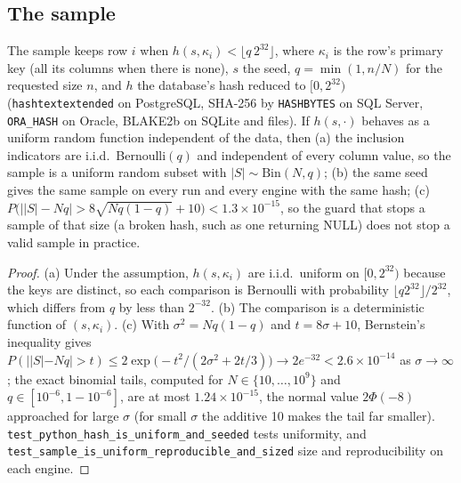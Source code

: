\subsection{The sample}
\begin{proposition}\label{prop:hashsample}
The sample keeps row $i$ when $h(s,\kappa_i)<\lfloor q\,2^{32}\rfloor$, where $\kappa_i$ is the row's primary key (all its columns when there is none), $s$ the seed, $q=\min(1,n/N)$ for the requested size $n$, and $h$ the database's hash reduced to $[0,2^{32})$ (\texttt{hashtextextended} on PostgreSQL, SHA-256 by \texttt{HASHBYTES} on SQL Server, \texttt{ORA\_HASH} on Oracle, BLAKE2b on SQLite and files). If $h(s,\cdot)$ behaves as a uniform random function independent of the data, then
(a) the inclusion indicators are i.i.d.\ Bernoulli$(q)$ and independent of every column value, so the sample is a uniform random subset with $|S|\sim\mathrm{Bin}(N,q)$;
(b) the same seed gives the same sample on every run and every engine with the same hash;
(c) $P\bigl(\bigl||S|-Nq\bigr|>8\sqrt{Nq(1-q)}+10\bigr)<1.3\times10^{-15}$, so the guard that stops a sample of that size (a broken hash, such as one returning NULL) does not stop a valid sample in practice.
\end{proposition}
\begin{proof}
(a) Under the assumption, $h(s,\kappa_i)$ are i.i.d.\ uniform on $[0,2^{32})$ because the keys are distinct, so each comparison is Bernoulli with probability $\lfloor q2^{32}\rfloor/2^{32}$, which differs from $q$ by less than $2^{-32}$. (b) The comparison is a deterministic function of $(s,\kappa_i)$. (c) With $\sigma^2=Nq(1-q)$ and $t=8\sigma+10$, Bernstein's inequality gives $P(||S|-Nq|>t)\le 2\exp\bigl(-t^2/(2\sigma^2+2t/3)\bigr)\to2e^{-32}<2.6\times10^{-14}$ as $\sigma\to\infty$; the exact binomial tails, computed for $N\in\{10,\dots,10^9\}$ and $q\in[10^{-6},1-10^{-6}]$, are at most $1.24\times10^{-15}$, the normal value $2\Phi(-8)$ approached for large $\sigma$ (for small $\sigma$ the additive 10 makes the tail far smaller). \texttt{test\_python\_hash\_is\_uniform\_and\_seeded} tests uniformity, and \texttt{test\_sample\_is\_uniform\_reproducible\_and\_sized} size and reproducibility on each engine.
\end{proof}

